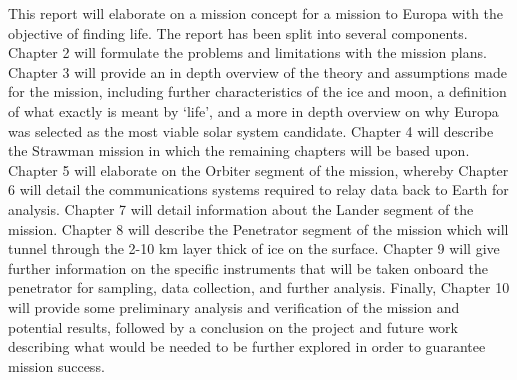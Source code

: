 This report will elaborate on a mission concept for a mission to Europa with the objective of finding life. The report has been split into several components. Chapter 2 will formulate the problems and limitations with the mission plans. Chapter 3 will provide an in depth overview of the theory and assumptions made for the mission, including further characteristics of the ice and moon, a definition of what exactly is meant by `life', and a more in depth overview on why Europa was selected as the most viable solar system candidate. Chapter 4 will describe the Strawman mission in which the remaining chapters will be based upon.  Chapter 5 will elaborate on the Orbiter segment of the mission, whereby Chapter 6 will detail the communications systems required to relay data back to Earth for analysis. Chapter 7 will detail information about the Lander segment of the mission. Chapter 8 will describe the Penetrator segment of the mission which will tunnel through the 2-10 km layer thick of ice on the surface. Chapter 9 will give further information on the specific instruments that will be taken onboard the penetrator for sampling, data collection, and further analysis. Finally, Chapter 10 will provide some preliminary analysis and verification of the mission and potential results, followed by a conclusion on the project and future work describing what would be needed to be further explored in order to guarantee mission success.
